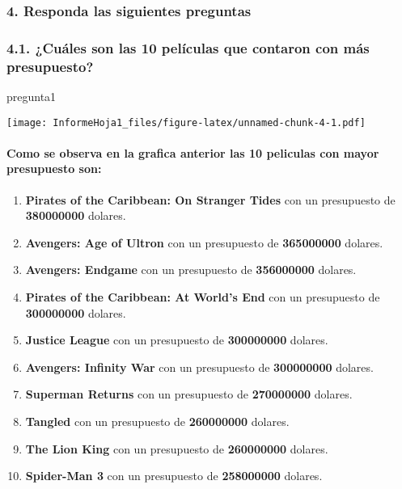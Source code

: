 \documentclass[
]{article}
\newenvironment{Shaded}{\begin{snugshade}}{\end{snugshade}}
\newcommand{\NormalTok}[1]{#1}
\providecommand{\tightlist}{%
  \setlength{\itemsep}{0pt}\setlength{\parskip}{0pt}}
\begin{document}
\hypertarget{responda-las-siguientes-preguntas}{%
\subsubsection{4. Responda las siguientes
preguntas}\label{responda-las-siguientes-preguntas}}

\hypertarget{cuuxe1les-son-las-10-peluxedculas-que-contaron-con-muxe1s-presupuesto}{%
\subsubsection{4.1. ¿Cuáles son las 10 películas que contaron con más
presupuesto?}\label{cuuxe1les-son-las-10-peluxedculas-que-contaron-con-muxe1s-presupuesto}}

\begin{Shaded}
\begin{Highlighting}[]
\NormalTok{pregunta1}
\end{Highlighting}
\end{Shaded}

\texttt{[image: InformeHoja1\_files/figure-latex/unnamed-chunk-4-1.pdf]}

\n

\hypertarget{como-se-observa-en-la-grafica-anterior-las-10-peliculas-con-mayor-presupuesto-son}{%
\paragraph{\texorpdfstring{Como se observa en la grafica anterior las 10
peliculas con mayor presupuesto
son:\n}{Como se observa en la grafica anterior las 10 peliculas con mayor presupuesto son:}}\label{como-se-observa-en-la-grafica-anterior-las-10-peliculas-con-mayor-presupuesto-son}}

\begin{enumerate}
\def\labelenumi{\arabic{enumi}.}
\tightlist
\item
  \textbf{Pirates of the Caribbean: On Stranger Tides} con un
  presupuesto de \textbf{380000000} dolares.
\item
  \textbf{Avengers: Age of Ultron} con un presupuesto de
  \textbf{365000000} dolares.
\item
  \textbf{Avengers: Endgame} con un presupuesto de \textbf{356000000}
  dolares.
\item
  \textbf{Pirates of the Caribbean: At World's End} con un presupuesto
  de \textbf{300000000} dolares.
\item
  \textbf{Justice League} con un presupuesto de \textbf{300000000}
  dolares.
\item
  \textbf{Avengers: Infinity War} con un presupuesto de
  \textbf{300000000} dolares.
\item
  \textbf{Superman Returns} con un presupuesto de \textbf{270000000}
  dolares.
\item
  \textbf{Tangled} con un presupuesto de \textbf{260000000} dolares.
\item
  \textbf{The Lion King} con un presupuesto de \textbf{260000000}
  dolares.
\item
  \textbf{Spider-Man 3} con un presupuesto de \textbf{258000000}
  dolares.
\end{enumerate}
\end{document}
